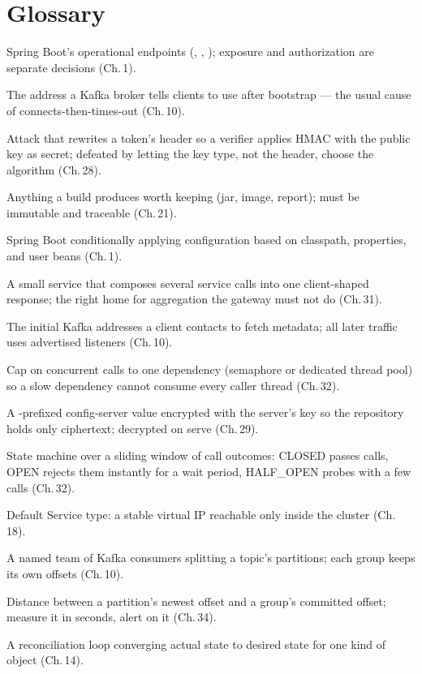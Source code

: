 \chapter{Glossary}
\label{app:glossary}

\newcommand{\gloss}[2]{\item[#1] #2}
\begin{description}\setlength{\itemsep}{2pt}
\gloss{Actuator}{Spring Boot's operational endpoints (\code{/actuator/health},
  \code{/metrics}, \code{/prometheus}); exposure and authorization are
  separate decisions (Ch.\,1).}
\gloss{Advertised listener}{The address a Kafka broker tells clients to
  use after bootstrap --- the usual cause of connects-then-times-out
  (Ch.\,10).}
\gloss{Algorithm confusion}{Attack that rewrites a token's \code{alg}
  header so a verifier applies HMAC with the public key as secret;
  defeated by letting the key type, not the header, choose the
  algorithm (Ch.\,28).}
\gloss{Artifact}{Anything a build produces worth keeping (jar, image,
  report); must be immutable and traceable (Ch.\,21).}
\gloss{Auto-configuration}{Spring Boot conditionally applying
  configuration based on classpath, properties, and user beans (Ch.\,1).}
\gloss{Backend for frontend}{A small service that composes several
  service calls into one client-shaped response; the right home for
  aggregation the gateway must not do (Ch.\,31).}
\gloss{Bootstrap servers}{The initial Kafka addresses a client contacts
  to fetch metadata; all later traffic uses advertised listeners
  (Ch.\,10).}
\gloss{Bulkhead}{Cap on concurrent calls to one dependency (semaphore
  or dedicated thread pool) so a slow dependency cannot consume every
  caller thread (Ch.\,32).}
\gloss{Cipher value}{A -prefixed config-server value
  encrypted with the server's key so the repository holds only
  ciphertext; decrypted on serve (Ch.\,29).}
\gloss{Circuit breaker}{State machine over a sliding window of call
  outcomes: CLOSED passes calls, OPEN rejects them instantly for a
  wait period, HALF\_OPEN probes with a few calls (Ch.\,32).}
\gloss{ClusterIP}{Default Service type: a stable virtual IP reachable
  only inside the cluster (Ch.\,18).}
\gloss{Consumer group}{A named team of Kafka consumers splitting a
  topic's partitions; each group keeps its own offsets (Ch.\,10).}
\gloss{Consumer lag}{Distance between a partition's newest offset and a
  group's committed offset; measure it in seconds, alert on it
  (Ch.\,34).}
\gloss{Controller (k8s)}{A reconciliation loop converging actual state
  to desired state for one kind of object (Ch.\,14).}

\end{description}
